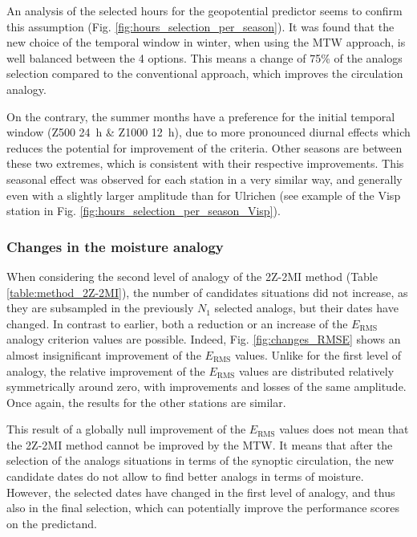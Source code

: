 \documentclass[hess, manuscript]{copernicus}
\begin{document}
An analysis of the selected hours for the geopotential predictor seems to confirm this assumption (Fig. \ref{fig:hours_selection_per_season}). It was found that the new choice of the temporal window in winter, when using the MTW approach, is well balanced between the 4 options. This means a change of 75\% of the analogs selection compared to the conventional approach, which improves the circulation analogy.

On the contrary, the summer months have a preference for the initial temporal window (Z500 24~h \& Z1000 12~h), due to more pronounced diurnal effects which reduces the potential for improvement of the criteria. Other seasons are between these two extremes, which is consistent with their respective improvements. This seasonal effect was observed for each station in a very similar way, and generally even with a slightly larger amplitude than for Ulrichen (see example of the Visp station in Fig. \ref{fig:hours_selection_per_season_Visp}).


\subsubsection{Changes in the moisture analogy}

When considering the second level of analogy of the 2Z-2MI method (Table \ref{table:method_2Z-2MI}), the number of candidates situations did not increase, as they are subsampled in the previously $N_{1}$ selected analogs, but their dates have changed. In contrast to earlier, both a reduction or an increase of the $E_{\text{RMS}}$ analogy criterion values are possible. Indeed, Fig. \ref{fig:changes_RMSE} shows an almost insignificant improvement of the $E_{\text{RMS}}$ values. Unlike for the first level of analogy, the relative improvement of the $E_{\text{RMS}}$ values are distributed relatively symmetrically around zero, with improvements and losses of the same amplitude. Once again, the results for the other stations are similar.

This result of a globally null improvement of the $E_{\text{RMS}}$ values does not mean that the 2Z-2MI method cannot be improved by the MTW. It means that after the selection of the analogs situations in terms of the synoptic circulation, the new candidate dates do not allow to find better analogs in terms of moisture. However, the selected dates have changed in the first level of analogy, and thus also in the final selection, which can potentially improve the performance scores on the predictand.
\end{document}
